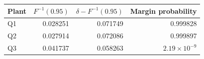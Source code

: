 \begin{tabular}{lrrr}\toprule
Plant & $F^{-1}(0.95)$ & $\delta-F^{-1}(0.95)$ & Margin probability \\\midrule
Q1 & 0.028251 & 0.071749 & 0.999828 \\
Q2 & 0.027914 & 0.072086 & 0.999897 \\
Q3 & 0.041737 & 0.058263 & $2.19\times10^{-9}$ \\
\bottomrule\end{tabular}
